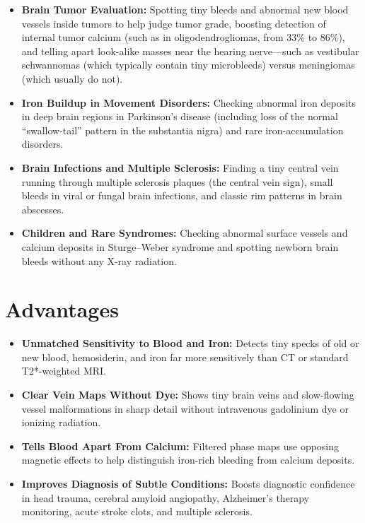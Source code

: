 \begin{itemize}
    \item \textbf{Brain Tumor Evaluation:} Spotting tiny bleeds and abnormal new blood vessels inside tumors to help judge tumor grade, boosting detection of internal tumor calcium (such as in oligodendrogliomas, from 33\% to 86\%), and telling apart look-alike masses near the hearing nerve---such as vestibular schwannomas (which typically contain tiny microbleeds) versus meningiomas (which usually do not).
    \item \textbf{Iron Buildup in Movement Disorders:} Checking abnormal iron deposits in deep brain regions in Parkinson's disease (including loss of the normal ``swallow-tail'' pattern in the substantia nigra) and rare iron-accumulation disorders.
    \item \textbf{Brain Infections and Multiple Sclerosis:} Finding a tiny central vein running through multiple sclerosis plaques (the central vein sign), small bleeds in viral or fungal brain infections, and classic rim patterns in brain abscesses.
    \item \textbf{Children and Rare Syndromes:} Checking abnormal surface vessels and calcium deposits in Sturge--Weber syndrome and spotting newborn brain bleeds without any X-ray radiation.
\end{itemize}

\section{Advantages}

\begin{itemize}
    \item \textbf{Unmatched Sensitivity to Blood and Iron:} Detects tiny specks of old or new blood, hemosiderin, and iron far more sensitively than CT or standard T2*-weighted MRI.
    \item \textbf{Clear Vein Maps Without Dye:} Shows tiny brain veins and slow-flowing vessel malformations in sharp detail without intravenous gadolinium dye or ionizing radiation.
    \item \textbf{Tells Blood Apart From Calcium:} Filtered phase maps use opposing magnetic effects to help distinguish iron-rich bleeding from calcium deposits.
    \item \textbf{Improves Diagnosis of Subtle Conditions:} Boosts diagnostic confidence in head trauma, cerebral amyloid angiopathy, Alzheimer's therapy monitoring, acute stroke clots, and multiple sclerosis.
\end{itemize}

